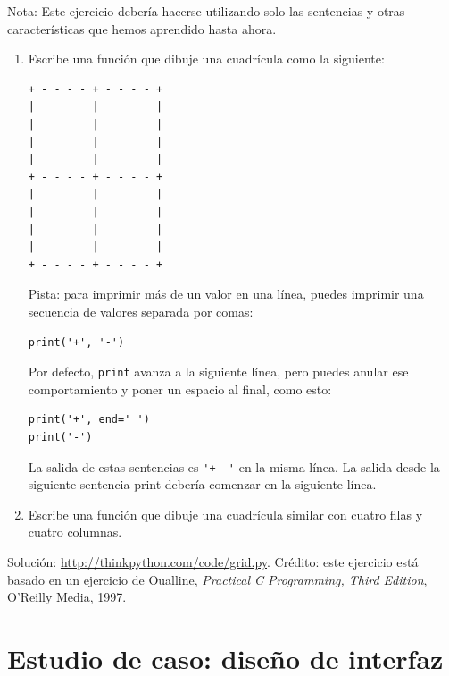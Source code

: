\documentclass[10pt]{book}
\begin{document}
\begin{exercise}

Nota: Este ejercicio debería hacerse
utilizando solo las sentencias y otras características que hemos aprendido hasta
ahora.

\begin{enumerate}

\item Escribe una función que dibuje una cuadrícula como la siguiente:
\newpage
\begin{verbatim}
+ - - - - + - - - - +
|         |         |
|         |         |
|         |         |
|         |         |
+ - - - - + - - - - +
|         |         |
|         |         |
|         |         |
|         |         |
+ - - - - + - - - - +
\end{verbatim}
%
Pista: para imprimir más de un valor en una línea, puedes imprimir
una secuencia de valores separada por comas:

\begin{verbatim}
print('+', '-')
\end{verbatim}
%
Por defecto, {\tt print} avanza a la siguiente línea, pero
puedes anular ese comportamiento y poner un espacio al final, como esto:

\begin{verbatim}
print('+', end=' ')
print('-')
\end{verbatim}
%
La salida de estas sentencias es \verb"'+ -'" en la misma línea.
La salida desde la siguiente sentencia print debería comenzar en la siguiente línea.

\item Escribe una función que dibuje una cuadrícula similar
con cuatro filas y cuatro columnas.

\end{enumerate}

Solución: \url{http://thinkpython.com/code/grid.py}.
Crédito: este ejercicio está basado en un ejercicio de Oualline, {\em
    Practical C Programming, Third Edition}, O'Reilly Media, 1997.

\end{exercise}





\chapter{Estudio de caso: diseño de interfaz}
\label{turtlechap}
\end{document}
